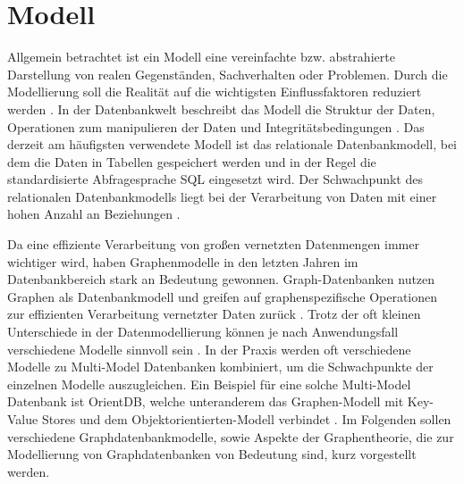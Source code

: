 \section{Modell}
Allgemein betrachtet ist ein Modell eine vereinfachte bzw. abstrahierte Darstellung von realen Gegenständen, Sachverhalten oder Problemen.
Durch die Modellierung soll die Realität auf die wichtigsten Einflussfaktoren reduziert werden \cite{datamodels}.
In der Datenbankwelt beschreibt das Modell die Struktur der Daten, Operationen zum manipulieren der Daten und Integritätsbedingungen \cite{efcodd}.
Das derzeit am häufigsten verwendete Modell ist das relationale Datenbankmodell, bei dem die Daten in Tabellen gespeichert werden und in der Regel die standardisierte Abfragesprache \ac{SQL} eingesetzt wird.
Der Schwachpunkt des relationalen Datenbankmodells liegt bei der Verarbeitung von Daten mit einer hohen Anzahl an Beziehungen \cite{vicknair2010comparison}.

Da eine effiziente Verarbeitung von großen vernetzten Datenmengen immer wichtiger wird, haben Graphenmodelle in den letzten Jahren im Datenbankbereich stark an Bedeutung gewonnen.
Graph-Datenbanken nutzen Graphen als Datenbankmodell und greifen auf graphenspezifische Operationen zur effizienten Verarbeitung vernetzter Daten zurück \cite{angles2008survey}.
Trotz der oft kleinen Unterschiede in der Datenmodellierung können je nach Anwendungsfall verschiedene Modelle sinnvoll sein \cite{angles2012comparison}.
In der Praxis werden oft verschiedene Modelle zu Multi-Model Datenbanken kombiniert, um die Schwachpunkte der einzelnen Modelle auszugleichen.
Ein Beispiel für eine solche Multi-Model Datenbank ist OrientDB, welche unteranderem das Graphen-Modell mit Key-Value Stores und dem Objektorientierten-Modell verbindet \cite{orient}.
Im Folgenden sollen verschiedene Graphdatenbankmodelle, sowie Aspekte der Graphentheorie, die zur Modellierung von Graphdatenbanken von Bedeutung sind, kurz vorgestellt werden.
\newpage
